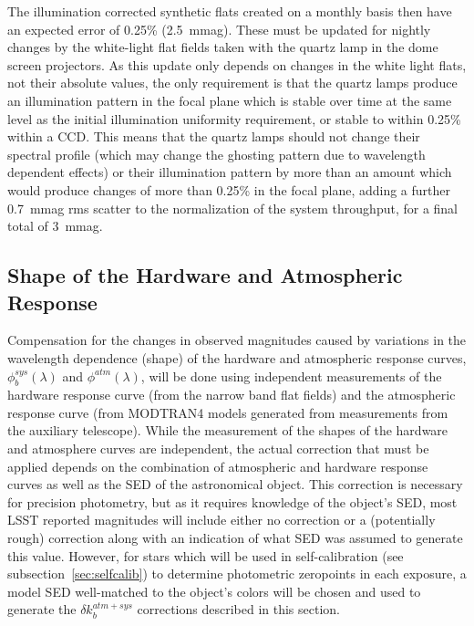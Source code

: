 \documentclass[12pt,preprint]{aastex}
\begin{document}
The illumination corrected synthetic flats created on a monthly basis
then have an expected error of 0.25\% (2.5~mmag). These must be
updated for nightly changes by the white-light flat fields taken with
the quartz lamp in the dome screen projectors. As this update only
depends on changes in the white light flats, not their absolute
values, the only requirement is that the quartz lamps produce an
illumination pattern in the focal plane which is stable over time at
the same level as the initial illumination uniformity requirement, or
stable to within 0.25\% within a CCD. This means that the quartz lamps
should not change their spectral profile (which may change the
ghosting pattern due to wavelength dependent effects) or their
illumination pattern by more than an amount which would produce
changes of more than 0.25\% in the focal plane, adding a further
0.7~mmag rms scatter to the normalization of the system throughput,
for a final total of 3~mmag.


\subsection{Shape of the Hardware and Atmospheric Response}
\label{sec:phi_correction}

Compensation for the changes in observed magnitudes caused by
variations in the wavelength dependence (shape) of the hardware and
atmospheric response curves, $\phi_b^{sys}(\lambda)$ and
$\phi^{atm}(\lambda)$, will be done using independent measurements of
the hardware response curve (from the narrow band flat fields) and the
atmospheric response curve (from MODTRAN4 models generated from
measurements from the auxiliary telescope).  While the measurement of
the shapes of the hardware and atmosphere curves are independent, the
actual correction that must be applied depends on the combination of
atmospheric and hardware response curves as well as the SED of the
astronomical object.  This correction is necessary for precision
photometry, but as it requires knowledge of the object's SED, most
LSST reported magnitudes will include either no correction or a
(potentially rough) correction along with an indication of what SED
was assumed to generate this value. However, for stars which will be
used in self-calibration (see subsection~\ref{sec:selfcalib}) to
determine photometric zeropoints in each exposure, a model SED
well-matched to the object's colors will be chosen and used to
generate the $\delta k_b^{atm+sys}$ corrections described in this
section.
\end{document}
